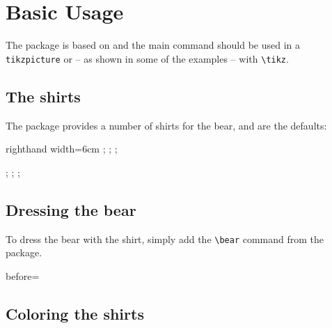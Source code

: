 \section{Basic Usage}

 The package is based on \TikZ{} and the main command should be used in a \texttt{tikzpicture} or -- as shown in some of the examples -- with \verb+\tikz+.

 \subsection{The shirts}
 The package provides a number of shirts for the bear,  and  are the defaults:
 \begin{tcblisting}{righthand width=6cm}
 \tikz{};
 \tikz\bearwear
   [t-shirt];
 \tikz{};

 \tikz\bearwear
   [v-neckline];
 \tikz{};
 \tikz{};
  \end{tcblisting}

 \subsection{Dressing the bear}

 To dress the bear with the shirt, simply add the \verb+\bear+ command from the  package.

 \begin{tcblisting}{before=\parindent0pt\nopagebreak}
 \tikz{\bear\bearwear[v-neckline];}
  \end{tcblisting}

 \subsection{Coloring the shirts}

